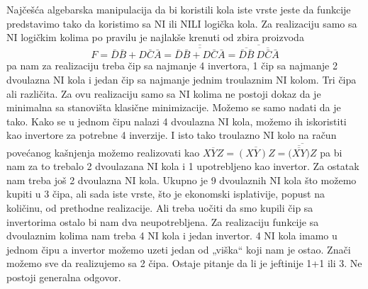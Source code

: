 \begin{frame}[label=02-s048]
\gusttekst
\setlength{\parskip}{3pt}
\setlength{\abovedisplayskip}{4pt}
\setlength{\belowdisplayskip}{4pt}
Najčešća algebarska manipulacija da bi koristili kola iste vrste jeste da funkcije predstavimo tako da koristimo sa NI ili NILI logička kola. Za realizaciju samo sa NI logičkim kolima po pravilu je najlakše krenuti od zbira proizvoda
\[
F=\bar D\bar B+D\bar C\bar A
=\overline{\overline{\bar D\bar B+D\bar C\bar A}}
=\overline{\overline{\bar D\bar B}\ \overline{D\bar C\bar A}}
\]
pa nam za realizaciju treba čip sa najmanje 4 invertora, 1 čip sa najmanje 2 dvoulazna NI kola i jedan čip sa najmanje jednim troulaznim NI kolom. Tri čipa ali različita. Za ovu realizaciju samo sa NI kolima ne postoji dokaz da je minimalna sa stanovišta klasične minimizacije. Možemo se samo nadati da je tako. Kako se u jednom čipu nalazi 4 dvoulazna NI kola, možemo ih iskoristiti kao invertore za potrebne 4 inverzije. I isto tako troulazno NI kolo na račun povećanog kašnjenja možemo realizovati kao
\(\overline{XYZ}=\overline{(XY)Z}=\overline{\bigl(\overline{\overline{XY}}\bigr)Z}\)
pa bi nam za to trebalo 2 dvoulazana NI kola i 1 upotrebljeno kao invertor. Za ostatak nam treba još 2 dvoulazna NI kola. Ukupno je 9 dvoulaznih NI kola što možemo kupiti u 3 čipa, ali sada iste vrste, što je ekonomski isplativije, popust na količinu, od prethodne realizacije. Ali treba uočiti da smo kupili čip sa invertorima ostalo bi nam dva neupotrebljena. Za realizaciju funkcije sa dvoulaznim kolima nam treba 4 NI kola i jedan invertor. 4 NI kola imamo u jednom čipu a invertor možemo uzeti jedan od „viška“ koji nam je ostao. Znači možemo sve da realizujemo sa 2 čipa. Ostaje pitanje da li je jeftinije 1+1 ili 3. Ne postoji generalna odgovor.
\end{frame}
